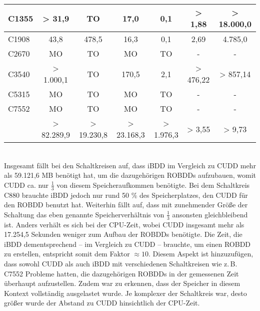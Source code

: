 \begin{table}[bth]
\begin{tabular}{ | l | c | c | c | c | c | c |}
		C1355 & > 31,9 & TO & 17,0 & 0,1 & > 1,88 & > 18.000,0 \\ \hline
		C1908 & 43,8 & 478,5 & 16,3 & 0,1 & 2,69 & 4.785,0 \\ \hline
		C2670 & MO & TO & MO & TO & - & - \\ \hline
		C3540 & > 1.000,1 & TO & 170,5 & 2,1 & > 476,22 & > 857,14 \\ \hline
		C5315 & MO & TO & MO & TO & - & - \\ \hline
		C7552 & MO & TO & MO & TO & - & - \\ \hlineB{3}
		\multicolumn{1}{|c|}{\textbf{Gesamt}} & > 82.289,9 & > 19.230,8 & > 23.168,3 & > 1.976,3 & > 3,55 & > 9,73\\ \hline
	\end{tabular}
\end{table}\\
Insgesamt fällt bei den Schaltkreisen auf, dass iBDD im Vergleich zu CUDD mehr als 59.121,6 MB benötigt hat, um die dazugehörigen ROBDDs aufzubauen, womit CUDD ca. nur $\frac{1}{3}$ von diesem Speicheraufkommen benötigte. Bei dem Schaltkreis \glqq C880\grqq{} brauchte iBDD jedoch nur rund 50 \% des Speicherplatzes, den CUDD für den ROBDD benutzt hat. Weiterhin fällt auf, dass mit zunehmender Größe der Schaltung das eben genannte Speicherverhältnis von $\frac{1}{3}$ ansonsten gleichbleibend ist. Anders verhält es sich bei der CPU-Zeit, wobei CUDD insgesamt mehr als 17.254,5 Sekunden weniger zum Aufbau der ROBDDs benötigte. Die Zeit, die iBDD dementsprechend -- im Vergleich zu CUDD -- brauchte, um einen ROBDD zu erstellen, entspricht somit dem Faktor $\approx 10$. Diesem Aspekt ist hinzuzufügen, dass sowohl CUDD als auch iBDD mit verschiedenen Schaltkreisen wie z.\,B. \glqq C7552\grqq{} Probleme hatten, die dazugehörigen ROBDDs in der gemessenen Zeit überhaupt aufzustellen. Zudem war zu erkennen, dass der Speicher in diesem Kontext vollständig ausgelastet wurde. Je komplexer der Schaltkreis war, desto größer wurde der Abstand zu CUDD hinsichtlich der CPU-Zeit.\\ 
